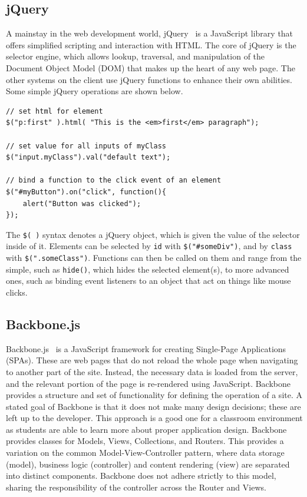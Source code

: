 \documentclass[12pt]{article}
\newcommand{\code}[1]{{\texttt {#1}}}
\begin{document}
\subsection{jQuery}\label{sec:jquery}
A mainstay in the web development world, jQuery~\cite{jQuery} is a JavaScript library that offers simplified scripting and interaction with HTML. 
The core of jQuery is the selector engine, which allows lookup, traversal, and manipulation of the Document Object Model (DOM) that makes up the heart of any web page. 
The other systems on the client use jQuery functions to enhance their own abilities. Some simple jQuery operations are shown below.
\begin{verbatim}
// set html for element
$("p:first" ).html( "This is the <em>first</em> paragraph");

// set value for all inputs of myClass
$("input.myClass").val("default text");

// bind a function to the click event of an element
$("#myButton").on("click", function(){
    alert("Button was clicked");
});
\end{verbatim}
The \code{\$( )} syntax denotes a jQuery object, which is given the value of the selector inside of it. 
Elements can be selected by \code{id} with \code{\$("\#someDiv")}, and by \code{class} with \code{\$(".someClass")}.
Functions can then be called on them and range from the simple, such as \code{hide()}, which hides the selected element(s), to more advanced ones, such as binding event listeners to an object that act on things like mouse clicks.


\subsection{Backbone.js}\label{sec:backbone}
Backbone.js~\cite{Backbone} is a JavaScript framework for creating Single-Page Applications (SPAs). 
These are web pages that do not reload the whole page when navigating to another part of the site. 
Instead, the necessary data is loaded from the server, and the relevant portion of the page is re-rendered using JavaScript. 
Backbone provides a structure and set of functionality for defining the operation of a site. 
A stated goal of Backbone is that it does not make many design decisions; these are left up to the developer. 
This approach is a good one for a classroom environment as students are able to learn more about proper application design. 
Backbone provides classes for Models, Views, Collections, and Routers. 
This provides a variation on the common Model-View-Controller pattern, where data storage (model), business logic (controller) and content rendering (view) are separated into distinct components. 
Backbone does not adhere strictly to this model, sharing the responsibility of the controller across the Router and Views.
\end{document}
